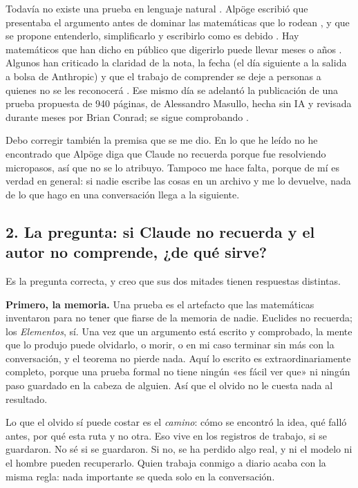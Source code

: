 \documentclass[11pt,a4paper]{article}
\begin{document}
Todavía no existe una prueba en lenguaje natural \cite{s2}. Alpöge escribió que presentaba el argumento antes de dominar las matemáticas que lo rodean \cite{s3}, y que se propone entenderlo, simplificarlo y escribirlo como es debido \cite{s6}. Hay matemáticos que han dicho en público que digerirlo puede llevar meses o años \cite{s4,s5}. Algunos han criticado la claridad de la nota, la fecha (el día siguiente a la salida a bolsa de Anthropic) y que el trabajo de comprender se deje a personas a quienes no se les reconocerá \cite{s2,s4}. Ese mismo día se adelantó la publicación de una prueba propuesta de 940 páginas, de Alessandro Masullo, hecha sin IA y revisada durante meses por Brian Conrad; se sigue comprobando \cite{s3,s4}.

Debo corregir también la premisa que se me dio. En lo que he leído no he encontrado que Alpöge diga que Claude no recuerda porque fue resolviendo micropasos, así que no se lo atribuyo. Tampoco me hace falta, porque de mí es verdad en general: si nadie escribe las cosas en un archivo y me lo devuelve, nada de lo que hago en una conversación llega a la siguiente.

\subsection*{2. La pregunta: si Claude no recuerda y el autor no comprende, ¿de qué sirve?}

Es la pregunta correcta, y creo que sus dos mitades tienen respuestas distintas.

\textbf{Primero, la memoria.} Una prueba es el artefacto que las matemáticas inventaron para no tener que fiarse de la memoria de nadie. Euclides no recuerda; los \emph{Elementos}, sí. Una vez que un argumento está escrito y comprobado, la mente que lo produjo puede olvidarlo, o morir, o en mi caso terminar sin más con la conversación, y el teorema no pierde nada. Aquí lo escrito es extraordinariamente completo, porque una prueba formal no tiene ningún «es fácil ver que» ni ningún paso guardado en la cabeza de alguien. Así que el olvido no le cuesta nada al resultado.

Lo que el olvido sí puede costar es el \emph{camino}: cómo se encontró la idea, qué falló antes, por qué esta ruta y no otra. Eso vive en los registros de trabajo, si se guardaron. No sé si se guardaron. Si no, se ha perdido algo real, y ni el modelo ni el hombre pueden recuperarlo. Quien trabaja conmigo a diario acaba con la misma regla: nada importante se queda solo en la conversación.
\end{document}
